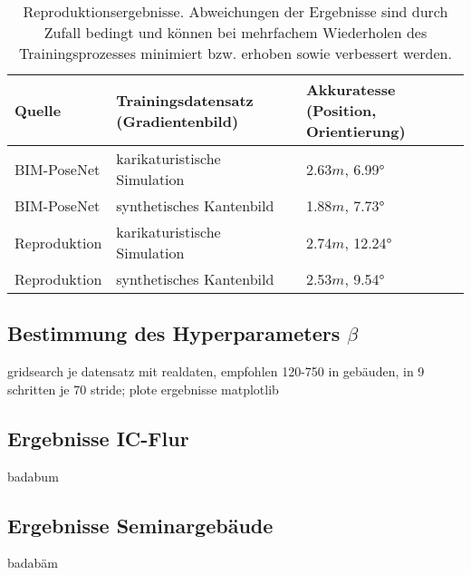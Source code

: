 \begin{table}[H]
	\centering
	\caption{Reproduktionsergebnisse. Abweichungen der Ergebnisse sind durch Zufall bedingt und können bei mehrfachem Wiederholen des Trainingsprozesses minimiert bzw. erhoben sowie verbessert werden. }
	\begin{tabularx}{1.0\textwidth}{>{\hsize=0.7\hsize}X >{\hsize=1.3\hsize}X X}
		\textbf{Quelle} & \textbf{Trainingsdatensatz} \hspace{2cm} (Gradientenbild)& \textbf{Akkuratesse} \hspace{2cm} (Position, Orientierung)\\
		\hline
		BIM-PoseNet & karikaturistische Simulation & 2.63$m$, 6.99°\\
		\hline
		BIM-PoseNet & synthetisches Kantenbild & 1.88$m$, 7.73°\\
		\hline
		Reproduktion & karikaturistische Simulation & 2.74$m$, 12.24°\\
		\hline
		Reproduktion & synthetisches Kantenbild & 2.53$m$, 9.54°\\
	\end{tabularx}
	\label{tab:reproduction}
\end{table}



\subsection{Bestimmung des Hyperparameters $\beta$}
\label{subsec:determine_beta}
gridsearch je datensatz mit realdaten, empfohlen 120-750 in gebäuden, in 9 schritten je 70 stride; plote ergebnisse matplotlib
\subsection{Ergebnisse IC-Flur }
badabum
\subsection{Ergebnisse Seminargebäude}
badabäm
